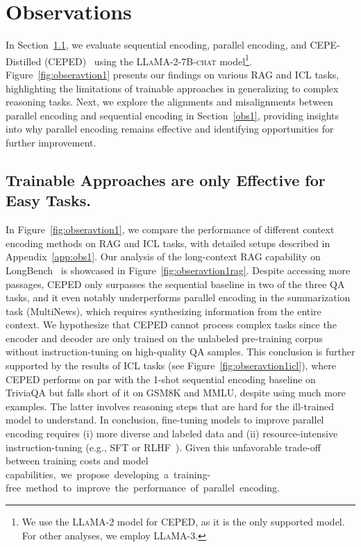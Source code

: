\section{Observations}
\label{obs}



In Section~\ref{obs2}, we evaluate sequential encoding, parallel encoding, and CEPE-Distilled (CEPED)~\citep{yen2024long} using the \textsc{LLaMA-2-7B-chat} model\footnote{We use the \textsc{LLaMA-2} model for CEPED, as it is the only supported model. For other analyses, we employ \textsc{LLaMA-3}.}. Figure~\ref{fig:obseravtion1} presents our findings on various RAG and ICL tasks, highlighting the limitations of trainable approaches in generalizing to complex reasoning tasks. Next, we explore the alignments and misalignments between parallel encoding and sequential encoding in Section~\ref{obs1}, providing insights into why parallel encoding remains effective and identifying opportunities for further improvement.

\subsection{Trainable Approaches are only Effective for Easy Tasks.}
\label{obs2}
In Figure~\ref{fig:obseravtion1}, we compare the performance of different context encoding methods on RAG and ICL tasks, with detailed setups described in Appendix~\ref{app:obs1}. Our analysis of the long-context RAG capability on LongBench~\citep{bai2023longbench} is showcased in Figure~\ref{fig:obseravtion1rag}. Despite accessing more passages, CEPED only surpasses the sequential baseline in two of the three QA tasks, and it even notably underperforms parallel encoding in the summarization task (MultiNews), which requires synthesizing information from the entire context. We hypothesize that CEPED cannot process complex tasks since the encoder and decoder are only trained on the unlabeled pre-training corpus without instruction-tuning on high-quality QA samples. This conclusion is further supported by the results of ICL tasks (see Figure~\ref{fig:obseravtion1icl}), where CEPED performs on par with the 1-shot sequential encoding baseline on TriviaQA but falls short of it on GSM8K and MMLU, despite using much more examples. The latter involves reasoning steps that are hard for the ill-trained model to understand. In conclusion, fine-tuning models to improve parallel encoding requires (i) more diverse and labeled data and (ii) resource-intensive instruction-tuning (e.g., SFT or RLHF~\citep{ouyang2022training}). Given this unfavorable trade-off between training costs and model \mbox{capabilities, we propose developing a training-free method to improve the performance of parallel encoding.}

